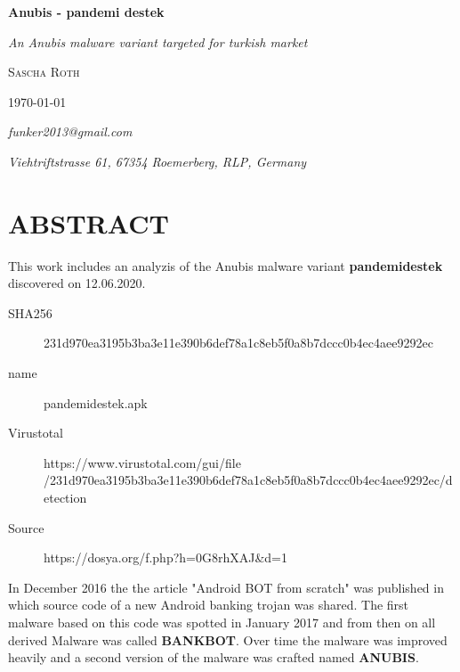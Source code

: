 \documentclass[10pt,titlepage]{article}
\begin{document}
\begin{titlepage}

\centering

\vspace*{1cm}
	\vspace{2cm}
	\vspace{1.5cm}
	{\huge\bfseries Anubis - pandemi destek\par}
	\vspace{1.5cm}
	{\Large\itshape An Anubis malware variant targeted for turkish market\par}
	\vspace{2cm}
	{\Large\scshape Sascha Roth\par}
	\vfill
	\vfill


	{\large \today\par}
	\vspace{2cm}
	{\itshape funker2013@gmail.com\par}
	{\itshape Viehtriftstrasse 61, 67354 Roemerberg, RLP, Germany\par}
\end{titlepage}

\setcounter{page}{1}

\section{ABSTRACT}
This work includes an analyzis of the Anubis malware variant \textbf{pandemidestek} discovered on 12.06.2020.

\begin{description}
\item[SHA256] 231d970ea3195b3ba3e11e390b6def78a1c8eb5f0a8b7dccc0b4ec4aee9292ec
\item[name] pandemidestek.apk
\item[Virustotal] https://www.virustotal.com/gui/file
\\ /231d970ea3195b3ba3e11e390b6def78a1c8eb5f0a8b7dccc0b4ec4aee9292ec/detection
\item[Source] https://dosya.org/f.php?h=0G8rhXAJ\&d=1
\end{description}

In December 2016 the the article "Android BOT from scratch" was published in which source code of a new Android banking trojan was shared. The first malware based on this code was spotted in January 2017 and from then on all derived Malware was called \textbf{BANKBOT}. Over time the malware was improved heavily and a second version of the malware was crafted named \textbf{ANUBIS}.\cite{ALLSTARTEDWITHBANKBOT} \cite{ANUBISTRENDMICRO}
\end{document}
